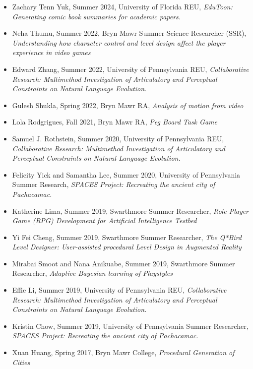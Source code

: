 \begin{itemize}[leftmargin=*,label={}]
  \item Zachary Tenn Yuk, Summer 2024, University of Florida REU, \textit{EduToon: Generating comic book summaries for academic papers.}
  \item Neha Thumu, Summer 2022, Bryn Mawr Summer Science Researcher (SSR), \textit{Understanding how character control and level design affect the player experience in video games}
  \item Edward Zhang, Summer 2022, University of Pennsylvania REU, \textit{Collaborative Research: Multimethod Investigation of Articulatory and Perceptual Constraints on Natural Language Evolution.}
  \item Gulesh Shukla, Spring 2022, Bryn Mawr RA, \textit{Analysis of motion from video}
  \item Lola Rodgrigues, Fall 2021, Bryn Mawr RA, \textit{Peg Board Task Game}
  \item Samuel J. Rothstein, Summer 2020, University of Pennsylvania REU, \textit{Collaborative Research: Multimethod Investigation of Articulatory and Perceptual Constraints on Natural Language Evolution.}
  \item Felicity Yick and Samantha Lee, Summer 2020, University of Pennsylvania Summer Research, \textit{SPACES Project: Recreating the ancient city of Pachacamac.}
  \item Katherine Lima, Summer 2019, Swarthmore Summer Researcher, \textit{Role Player Game (RPG) Development for Artificial Intelligence Testbed}
  \item Yi Fei Cheng, Summer 2019, Swarthmore Summer Researcher, \textit{The Q*Bird Level Designer: User-assisted procedural Level Design in Augmented Reality}
  \item Mirabai Smoot and Nana Anikuabe, Summer 2019, Swarthmore Summer Researcher, \textit{Adaptive Bayesian learning of Playstyles}
  \item Effie Li, Summer 2019, University of Pennsylvania REU, \textit{Collaborative Research: Multimethod Investigation of Articulatory and Perceptual Constraints on Natural Language Evolution.}
  \item Kristin Chow, Summer 2019, University of Pennsylvania Summer Researcher, \textit{SPACES Project: Recreating the ancient city of Pachacamac.}
  \item Xuan Huang, Spring 2017, Bryn Mawr College, \textit{Procedural Generation of Cities}
\end{itemize}


